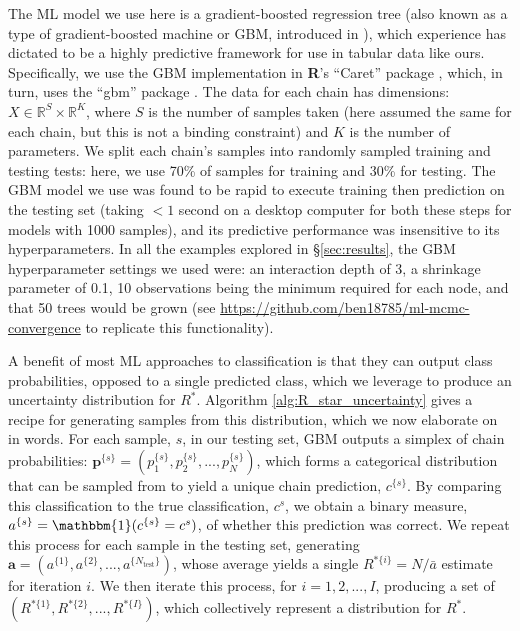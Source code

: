 \documentclass{article}
\begin{document}
The ML model we use here is a gradient-boosted regression tree (also known as a type of gradient-boosted machine or GBM, introduced in \cite{friedman2001greedy}), which experience has dictated to be a highly predictive framework for use in tabular data \cite{chollet2018} like ours. Specifically, we use the GBM implementation in \textbf{\textsf{R}}'s ``Caret'' package \cite{kuhn2008building}, which, in turn, uses the ``gbm'' package \cite{greenwell2019package}. The data for each chain has dimensions: $X\in \mathbb{R}^{S}\times \mathbb{R}^{K}$, where $S$ is the number of samples taken (here assumed the same for each chain, but this is not a binding constraint) and $K$ is the number of parameters. We split each chain's samples into randomly sampled training and testing tests: here, we use 70\% of samples for training and 30\% for testing. The GBM model we use was found to be rapid to execute training then prediction on the testing set (taking $<1$ second on a desktop computer for both these steps for models with 1000 samples), and its predictive performance was insensitive to its hyperparameters. In all the examples explored in \S\ref{sec:results}, the GBM hyperparameter settings we used were: an interaction depth of 3, a shrinkage parameter of 0.1, 10 observations being the minimum required for each node, and that 50 trees would be grown (see \url{https://github.com/ben18785/ml-mcmc-convergence} to replicate this functionality).

A benefit of most ML approaches to classification is that they can output class probabilities, opposed to a single predicted class, which we leverage to produce an uncertainty distribution for $R^*$. Algorithm \ref{alg:R_star_uncertainty} gives a recipe for generating samples from this distribution, which we now elaborate on in words. For each sample, $s$, in our testing set, GBM outputs a simplex of chain probabilities: $\boldsymbol{p}^{\{s\}}=(p_1^{\{s\}},p_2^{\{s\}},...,p_N^{\{s\}})$, which forms a categorical distribution that can be sampled from to yield a unique chain prediction, $c^{\{s\}}$. By comparing this classification to the true classification, $c^s$, we obtain a binary measure, $a^{\{s\}}=\mathbbm{1}(c^{\{s\}}=c^s)$, of whether this prediction was correct. We repeat this process for each sample in the testing set, generating $\boldsymbol{a}=(a^{\{1\}},a^{\{2\}},...,a^{\{N_\text{test}\}})$, whose average yields a single $R^{*\{i\}}=N/\bar{a}$ estimate for iteration $i$. We then iterate this process, for $i=1,2,...,I$, producing a set of $(R^{*\{1\}},R^{*\{2\}},...,R^{*\{I\}})$, which collectively represent a distribution for $R^*$. 
\end{document}
